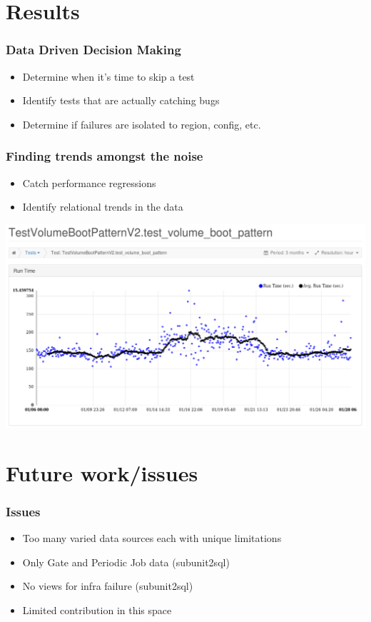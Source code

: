 \documentclass[aspectratio=43,11pt,hyperref={colorlinks=true}]{beamer}
\begin{document}
\section{Results}
\begin{frame}
    \frametitle{Data Driven Decision Making}
    \begin{itemize}
        \item Determine when it's time to skip a test
        \item Identify tests that are actually catching bugs
        \item Determine if failures are isolated to region, config, etc.
    \end{itemize}
\end{frame}

\begin{frame}
    \frametitle{Finding trends amongst the noise}
    \begin{itemize}
        \item Catch performance regressions
        \item Identify relational trends in the data
    \end{itemize}
    \begin{center}
        \includegraphics[height=.7\textheight]{Performance-Issue-o-h.png}
    \end{center}
\end{frame}

\section{Future work/issues}

\begin{frame}
    \frametitle{Issues}
    \begin{itemize}
        \item Too many varied data sources each with unique limitations
        \item Only Gate and Periodic Job data (subunit2sql)
        \item No views for infra failure (subunit2sql)
        \item Limited contribution in this space
    \end{itemize}
\end{frame}
\end{document}
